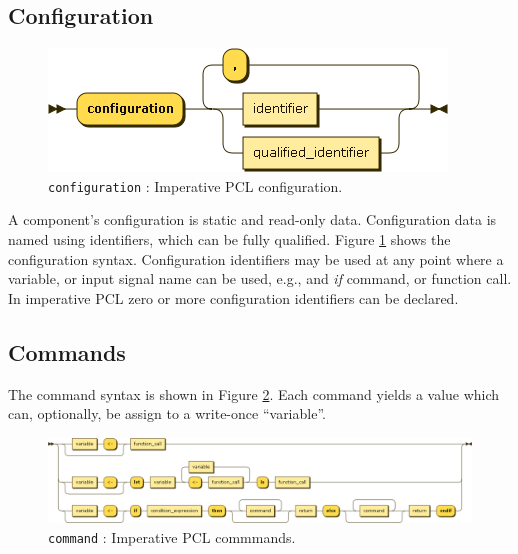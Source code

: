 \subsection{Configuration}
\begin{figure}[h!]
  \centering
    \includegraphics[scale=\DiagramScale]{chapters/adapter/diagrams/configuration}
  \caption{\texttt{configuration} : Imperative PCL configuration.}
  \label{fig:imperative-pcl-config}
\end{figure}
A component's configuration is static and read-only data. Configuration data is named using identifiers, which can be fully qualified. Figure \ref{fig:imperative-pcl-config} shows the configuration syntax. Configuration identifiers may be used at any point where a variable, or input signal name can be used, e.g., and \emph{if} command, or function call. In imperative PCL zero or more configuration identifiers can be declared.

\clearpage

\subsection{Commands}
The command syntax is shown in Figure \ref{fig:imperative-pcl-command}. Each command yields a value which can, optionally, be assign to a write-once ``variable''. 
\begin{figure}[h!]
  \centering
    \includegraphics[scale=0.45,angle=90]{chapters/adapter/diagrams/command}
  \caption{\texttt{command} : Imperative PCL commmands.}
  \label{fig:imperative-pcl-command}
\end{figure}

